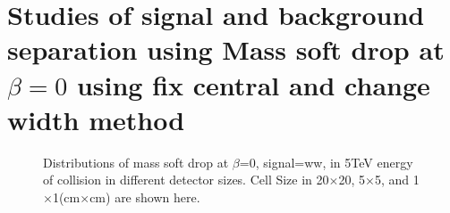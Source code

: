 \documentclass[final,1p,11pt]{elsarticle}
\begin{document}
\section{Studies of signal and background separation using Mass soft drop at $\beta=0$ using fix central and change width method}

\label{sec:Mann Whitney U test}

\begin{figure}
\begin{center}

\end{center}
\caption{Distributions of mass soft drop at $\beta$=0, signal=ww, in 5TeV energy of collision  in different detector sizes. Cell Size in 20$\times$20, 5$\times$5, and 1$\times$1(cm$\times$cm) are shown here.}
\label{fig:cluster_tau21_tau32}
\end{figure}
\end{document}

